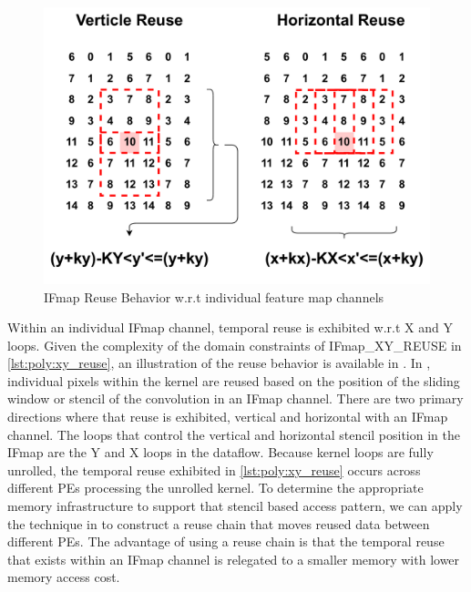 \begin{figure}[]
    \centering
    \includegraphics[scale=0.4]{fig/xy_reuse.pdf}
    \caption{IFmap Reuse Behavior w.r.t individual feature map channels}
    \label{fig:IFmap_xy_reuse}
\end{figure}

Within an individual IFmap channel, temporal reuse is exhibited w.r.t X and Y
loops. Given the complexity of the domain constraints of IFmap\_XY\_REUSE in
\autoref{lst:poly:xy_reuse}, an illustration of the reuse behavior is available
in . In , individual
pixels within the kernel are reused based on the position of the sliding window
or stencil of the convolution in an IFmap channel. There are two primary
directions where that reuse is exhibited, vertical and horizontal with an IFmap
channel. The loops that control the vertical and horizontal stencil position in
the IFmap are the Y and X loops in the dataflow. Because kernel loops are fully
unrolled, the temporal reuse exhibited in \autoref{lst:poly:xy_reuse} occurs
across different PEs processing the unrolled kernel. To determine the appropriate memory
infrastructure to support that stencil based access pattern, we can apply the
technique in \cite{meeus} to construct a reuse chain that moves reused data
between different PEs. The advantage of using a reuse chain is that the
temporal reuse that exists within an IFmap channel is relegated to a smaller
memory with lower memory access cost.

